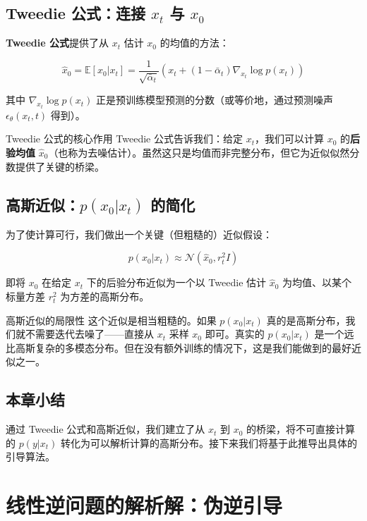 \documentclass[a4paper]{article}
\begin{document}
\subsection{Tweedie 公式：连接 $x_t$ 与 $x_0$}

\textbf{Tweedie 公式}提供了从 $x_t$ 估计 $x_0$ 的均值的方法：

$$
\hat{x}_0 = \mathbb{E}[x_0 | x_t] = \frac{1}{\sqrt{\bar{\alpha}_t}} \left( x_t + (1 - \bar{\alpha}_t) \nabla_{x_t} \log p(x_t) \right)
$$

其中 $\nabla_{x_t} \log p(x_t)$ 正是预训练模型预测的分数（或等价地，通过预测噪声 $\epsilon_\theta(x_t, t)$ 得到）。

\begin{importantbox}{Tweedie 公式的核心作用}
Tweedie 公式告诉我们：给定 $x_t$，我们可以计算 $x_0$ 的\textbf{后验均值} $\hat{x}_0$（也称为去噪估计）。虽然这只是均值而非完整分布，但它为近似似然分数提供了关键的桥梁。
\end{importantbox}

\subsection{高斯近似：$p(x_0 | x_t)$ 的简化}

为了使计算可行，我们做出一个关键（但粗糙的）近似假设：

$$
p(x_0 | x_t) \approx \mathcal{N}(\hat{x}_0, r_t^2 I)
$$

即将 $x_0$ 在给定 $x_t$ 下的后验分布近似为一个以 Tweedie 估计 $\hat{x}_0$ 为均值、以某个标量方差 $r_t^2$ 为方差的高斯分布。

\begin{warningbox}{高斯近似的局限性}
这个近似是相当粗糙的。如果 $p(x_0|x_t)$ 真的是高斯分布，我们就不需要迭代去噪了——直接从 $x_t$ 采样 $x_0$ 即可。真实的 $p(x_0|x_t)$ 是一个远比高斯复杂的多模态分布。但在没有额外训练的情况下，这是我们能做到的最好近似之一。
\end{warningbox}

\subsection{本章小结}

通过 Tweedie 公式和高斯近似，我们建立了从 $x_t$ 到 $x_0$ 的桥梁，将不可直接计算的 $p(y|x_t)$ 转化为可以解析计算的高斯分布。接下来我们将基于此推导出具体的引导算法。


\section{线性逆问题的解析解：伪逆引导}
\end{document}
